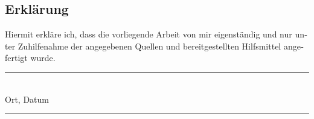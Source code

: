 \cleardoublepage

\thispagestyle{empty} \makeatletter

\begin{otherlanguage}{ngerman}

\section*{Erklärung}


Hiermit erkläre ich, dass die vorliegende Arbeit \glqq\@title\grqq\xspace von mir eigenständig und nur unter Zuhilfenahme der angegebenen Quellen und bereitgestellten Hilfsmittel angefertigt wurde.

\vspace{1cm}

\parbox{\textwidth}{
  \parbox{7cm}{
    \centering
    \phantom{Erlangen, \@date}
    \rule{6cm}{1pt}\\
    Ort, Datum
  }
  \hfill
  \parbox{7cm}{
    \centering
    \phantom{Erlangen, \@date}
    \rule{6cm}{1pt}\\
    \@author
  }
}

\end{otherlanguage}

\makeatother
